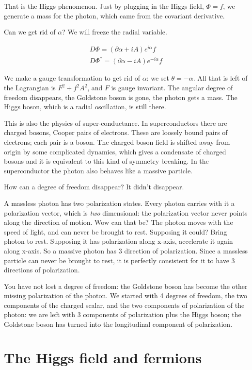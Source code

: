 \documentclass[]{article}
\begin{document}
That is the Higgs phenomenon. Just by plugging in the Higgs field, $\Phi=f$, we generate a mass for the photon, which came from the covariant derivative.

Can we get rid of $\alpha$? We will freeze the radial variable.

\begin{align*}
	D \Phi = (\partial \alpha + iA)e^{i\alpha}f\\
	D \Phi^* = (\partial \alpha - iA)e^{-i\alpha}f
\end{align*}

We make a gauge transformation to get rid of $\alpha$: we set $\theta=-\alpha$. All that is left of the Lagrangian is $F^2+f^2A^2$, and $F$ is gauge invariant. The angular degree of freedom disappears, the Goldstone boson is gone, the photon gets a mass. The Higgs boson, which is a radial oscillation, is still there.

This is also the physics of super-conductance. In superconductors there are charged bosons, Cooper pairs of electrons. These are loosely bound pairs of electrons; each pair is a boson. The charged boson field is shifted away from origin by some complicated dynamics, which gives a condensate of charged bosons and it is equivalent to this kind of symmetry breaking. In the superconductor the photon also behaves like a massive particle.

How can a degree of freedom disappear? It didn't disappear.

A massless photon has two polarization states. Every photon carries with it a polarization vector, which is \emph{two} dimensional: the polarization vector never points along the direction of motion. Wow can that be? The photon moves with the speed of light, and can never be brought to rest. Supposing it could? Bring photon to rest. Supposing it has polarization along x-axis, accelerate it again along x-axis. So a massive photon has 3 direction of polarization. Since a massless particle can never be brought to rest, it is perfectly consistent for it to have 3 directions of polarization.

You have not lost a degree of freedom: the Goldstone boson has become the other missing polarization of the photon. We started with 4 degrees of freedom, the two components of the charged scalar, and the two components of polarization of the photon: we are left with 3 components of polarization plus the Higgs boson; the Goldstone boson has turned into the longitudinal component of polarization. 

\section{The Higgs field and fermions}
\end{document}
